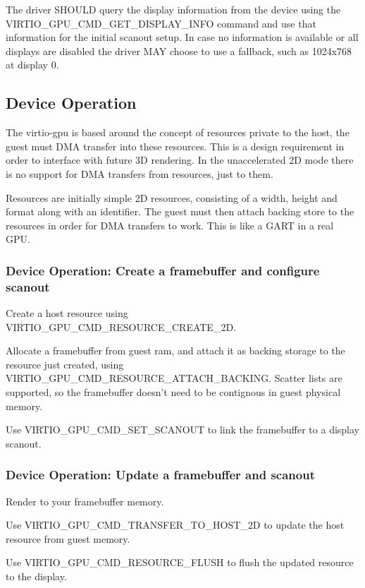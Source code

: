 The driver SHOULD query the display information from the device using
the VIRTIO_GPU_CMD_GET_DISPLAY_INFO command and use that information
for the initial scanout setup.  In case no information is available or
all displays are disabled the driver MAY choose to use a fallback,
such as 1024x768 at display 0.

\subsection{Device Operation}\label{sec:Device Types / GPU Device / Device Operation}

The virtio-gpu is based around the concept of resources private to the
host, the guest must DMA transfer into these resources. This is a
design requirement in order to interface with future 3D rendering. In
the unaccelerated 2D mode there is no support for DMA transfers from
resources, just to them.

Resources are initially simple 2D resources, consisting of a width,
height and format along with an identifier. The guest must then attach
backing store to the resources in order for DMA transfers to
work. This is like a GART in a real GPU.

\subsubsection{Device Operation: Create a framebuffer and configure scanout}

\begin{itemize*}
\item Create a host resource using VIRTIO_GPU_CMD_RESOURCE_CREATE_2D.
\item Allocate a framebuffer from guest ram, and attach it as backing
  storage to the resource just created, using
  VIRTIO_GPU_CMD_RESOURCE_ATTACH_BACKING.  Scatter lists are
  supported, so the framebuffer doesn't need to be contignous in guest
  physical memory.
\item Use VIRTIO_GPU_CMD_SET_SCANOUT to link the framebuffer to
  a display scanout.
\end{itemize*}

\subsubsection{Device Operation: Update a framebuffer and scanout}

\begin{itemize*}
\item Render to your framebuffer memory.
\item Use VIRTIO_GPU_CMD_TRANSFER_TO_HOST_2D to update the host resource
  from guest memory.
\item Use VIRTIO_GPU_CMD_RESOURCE_FLUSH to flush the updated resource
  to the display.
\end{itemize*}

